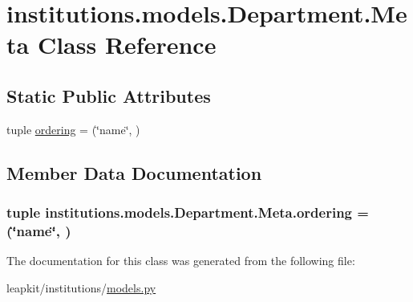 \hypertarget{classinstitutions_1_1models_1_1_department_1_1_meta}{\section{institutions.\-models.\-Department.\-Meta Class Reference}
\label{classinstitutions_1_1models_1_1_department_1_1_meta}
}
\subsection*{Static Public Attributes}
\begin{DoxyCompactItemize}
\item 
tuple \hyperlink{classinstitutions_1_1models_1_1_department_1_1_meta_a5dd43f37953a6729243113b7cee20c25}{ordering} = (\char`\"{}name\char`\"{}, )
\end{DoxyCompactItemize}


\subsection{Member Data Documentation}
\hypertarget{classinstitutions_1_1models_1_1_department_1_1_meta_a5dd43f37953a6729243113b7cee20c25}{
\subsubsection[{ordering}]{\setlength{\rightskip}{0pt plus 5cm}tuple institutions.\-models.\-Department.\-Meta.\-ordering = (\char`\"{}name\char`\"{}, )\hspace{0.3cm}{\ttfamily [static]}}}\label{classinstitutions_1_1models_1_1_department_1_1_meta_a5dd43f37953a6729243113b7cee20c25}


The documentation for this class was generated from the following file\-:\begin{DoxyCompactItemize}
\item 
leapkit/institutions/\hyperlink{institutions_2models_8py}{models.\-py}\end{DoxyCompactItemize}
